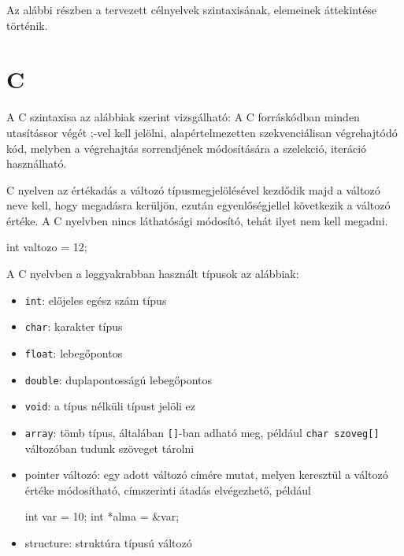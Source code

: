 


Az alábbi részben a tervezett célnyelvek szintaxisának, elemeinek áttekintése történik.



\section{C}

A C szintaxisa az alábbiak szerint vizsgálható:
A C forráskódban minden utasítássor végét ;-vel kell jelölni, alapértelmezetten szekvenciálisan végrehajtódó kód, melyben a végrehajtás sorrendjének módosítására a szelekció, iteráció használható.

C nyelven az értékadás a változó típusmegjelölésével kezdődik majd a változó neve kell, hogy megadásra kerüljön, ezután egyenlőségjellel következik a változó értéke. A C nyelvben nincs láthatósági módosító, tehát ilyet nem kell megadni.

\begin{cpp}
int valtozo = 12;
\end{cpp}

A C nyelvben a leggyakrabban használt típusok az alábbiak:
\begin{itemize}
\item \texttt{int}: előjeles egész szám típus
\item \texttt{char}: karakter típus
\item \texttt{float}: lebegőpontos 
\item \texttt{double}: duplapontosságú lebegőpontos
\item \texttt{void}: a típus nélküli típust jelöli ez
\item \texttt{array}: tömb típus, általában \texttt{[]}-ban adható meg, például \texttt{char szoveg[]} változóban tudunk szöveget tárolni
\item pointer változó: egy adott változó címére mutat, melyen keresztül a változó értéke módosítható, címszerinti átadás elvégezhető, például
\begin{cpp}
int var = 10;
int *alma = &var;
\end{cpp}
\item structure: struktúra típusú változó
\end{itemize}

